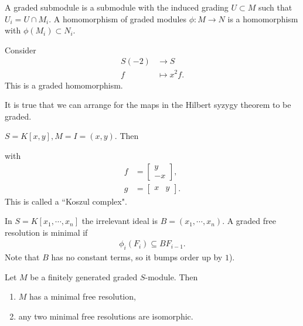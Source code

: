 \begin{definition}
    A graded submodule is a submodule with the induced grading $U \subset M$ such that $U_i = U \cap M_i$.
    A homomorphism of graded modules $\phi :M \to N $ is a homomorphism with $\phi(M_i) \subset N_i$.
\end{definition}

\begin{example} Consider
\begin{align*}
    S(-2) & \to S\\
    f &\mapsto x^2 f .
\end{align*}
This is a graded homomorphism.
\end{example}

It is true that we can arrange for the maps in the Hilbert syzygy theorem to be graded.

\begin{example}
    $S = K[x,y], M = I = (x,y)$. Then
    \begin{center}
    \end{center}
    with
    \begin{align*}
        f &= \begin{bmatrix} y\\-x \end{bmatrix},\\
        g &= \begin{bmatrix} x & y \end{bmatrix}.
    \end{align*}
    This is called a ``Koszul complex".
\end{example}

\begin{definition}
    In $S = K[x_1, \cdots , x_n]$ the irrelevant ideal is $B = (x_1, \cdots, x_n) $. A graded free resolution is minimal if
    \begin{align*}
        \phi_i (F_i ) \subseteq BF_{i-1}.
    \end{align*}
    Note that $B $ has no constant terms, so it bumps order up by $1$).
\end{definition}

\begin{theorem}
    Let $M $ be a finitely generated graded $S$-module. Then
    \begin{enumerate}
        \item $M$ has a minimal free resolution,
        \item any two minimal free resolutions are isomorphic.
    \end{enumerate}
\end{theorem}

